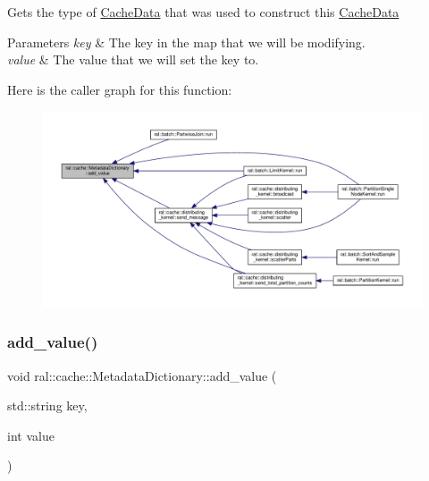 Gets the type of \hyperlink{classral_1_1cache_1_1CacheData}{Cache\+Data} that was used to construct this \hyperlink{classral_1_1cache_1_1CacheData}{Cache\+Data} 
\begin{DoxyParams}{Parameters}
{\em key} & The key in the map that we will be modifying. \\
\hline
{\em value} & The value that we will set the key to. \\
\hline
\end{DoxyParams}
Here is the caller graph for this function\+:\nopagebreak
\begin{figure}[H]
\begin{center}
\leavevmode
\includegraphics[width=350pt]{classral_1_1cache_1_1MetadataDictionary_a99828bf2a71b8e06d568420e5c2b460d_icgraph}
\end{center}
\end{figure}
\mbox{\label{classral_1_1cache_1_1MetadataDictionary_a5f2f0c2542ea15ca00d273df68041551}} 
\subsubsection{\texorpdfstring{add\+\_\+value()}{add\_value()}\hspace{0.1cm}{\footnotesize\ttfamily [2/2]}}
{\footnotesize\ttfamily void ral\+::cache\+::\+Metadata\+Dictionary\+::add\+\_\+value (\begin{DoxyParamCaption}\item[{std\+::string}]{key,  }\item[{int}]{value }\end{DoxyParamCaption})\hspace{0.3cm}{\ttfamily [inline]}}

